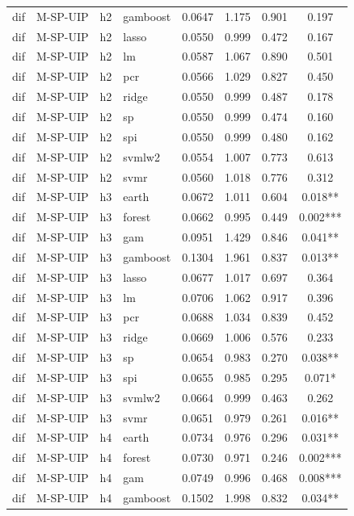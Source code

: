 \begin{ThreePartTable}
\begin{longtable}[t]{llclcccc}
dif & M-SP-UIP & h2 & gamboost & 0.0647 & 1.175 & 0.901 & 0.197\\
dif & M-SP-UIP & h2 & lasso & 0.0550 & 0.999 & 0.472 & 0.167\\
dif & M-SP-UIP & h2 & lm & 0.0587 & 1.067 & 0.890 & 0.501\\
dif & M-SP-UIP & h2 & pcr & 0.0566 & 1.029 & 0.827 & 0.450\\
dif & M-SP-UIP & h2 & ridge & 0.0550 & 0.999 & 0.487 & 0.178\\
dif & M-SP-UIP & h2 & sp & 0.0550 & 0.999 & 0.474 & 0.160\\
dif & M-SP-UIP & h2 & spi & 0.0550 & 0.999 & 0.480 & 0.162\\
dif & M-SP-UIP & h2 & svmlw2 & 0.0554 & 1.007 & 0.773 & 0.613\\
dif & M-SP-UIP & h2 & svmr & 0.0560 & 1.018 & 0.776 & 0.312\\
\addlinespace
dif & M-SP-UIP & h3 & earth & 0.0672 & 1.011 & 0.604 & 0.018**\\
dif & M-SP-UIP & h3 & forest & 0.0662 & 0.995 & 0.449 & 0.002***\\
dif & M-SP-UIP & h3 & gam & 0.0951 & 1.429 & 0.846 & 0.041**\\
dif & M-SP-UIP & h3 & gamboost & 0.1304 & 1.961 & 0.837 & 0.013**\\
dif & M-SP-UIP & h3 & lasso & 0.0677 & 1.017 & 0.697 & 0.364\\
dif & M-SP-UIP & h3 & lm & 0.0706 & 1.062 & 0.917 & 0.396\\
dif & M-SP-UIP & h3 & pcr & 0.0688 & 1.034 & 0.839 & 0.452\\
dif & M-SP-UIP & h3 & ridge & 0.0669 & 1.006 & 0.576 & 0.233\\
dif & M-SP-UIP & h3 & sp & 0.0654 & 0.983 & 0.270 & 0.038**\\
dif & M-SP-UIP & h3 & spi & 0.0655 & 0.985 & 0.295 & 0.071*\\
dif & M-SP-UIP & h3 & svmlw2 & 0.0664 & 0.999 & 0.463 & 0.262\\
dif & M-SP-UIP & h3 & svmr & 0.0651 & 0.979 & 0.261 & 0.016**\\
\addlinespace
dif & M-SP-UIP & h4 & earth & 0.0734 & 0.976 & 0.296 & 0.031**\\
dif & M-SP-UIP & h4 & forest & 0.0730 & 0.971 & 0.246 & 0.002***\\
dif & M-SP-UIP & h4 & gam & 0.0749 & 0.996 & 0.468 & 0.008***\\
dif & M-SP-UIP & h4 & gamboost & 0.1502 & 1.998 & 0.832 & 0.034**\\

\end{longtable}
\end{ThreePartTable}
